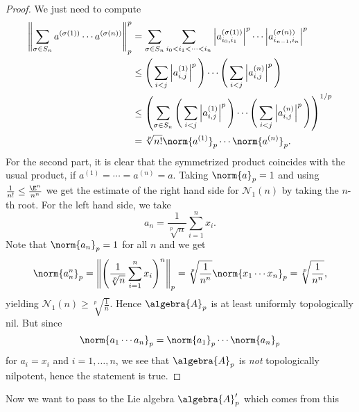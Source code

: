 \documentclass[
11pt,                          %
english                        %
]{article}
\begin{document}
\begin{proof}
	We just need to compute
	\begin{align*}
		\left\Vert
			\sum\limits_{\sigma \in S_n}
			a^{(\sigma(1))} \cdots a^{(\sigma(n))}
		\right\Vert_p^p
		&=
		\sum\limits_{\sigma \in S_n}
		\sum\limits_{i_0 < i_1 < \cdots < i_n}
		\left|
			a_{i_0, i_1}^{(\sigma(1))}
		\right|^p
			\cdots
		\left|
			a_{i_{n-1}, i_n}^{(\sigma(n))}
		\right|^p
		\\
		& \leq
		\Bigg(
			\sum\limits_{i < j}
			\left|
				a_{i,j}^{(1)}
			\right|^p
		\Bigg)
		\cdots
		\Bigg(
			\sum\limits_{i < j}
			\left|
				a_{i,j}^{(n)}
			\right|^p
		\Bigg)
		\\
		& \leq
		\left(
			\sum\limits_{\sigma \in S_n}
			\Bigg(
				\sum\limits_{i < j}
				\left|
					a_{i,j}^{(1)}
				\right|^p
			\Bigg)
			\cdots
			\Bigg(
				\sum\limits_{i < j}
				\left|
					a_{i,j}^{(n)}
				\right|^p
			\Bigg)
		\right)^{1/p}
		\\
		&=
		\sqrt[p]{n!}
		\norm{a^{(1)}}_p \cdots \norm{a^{(n)}}_p.
	\end{align*}
	For the second part, it is clear that the symmetrized product coincides with 
	the usual product, if $a^{(1)} = \cdots = a^{(n)} = a$. Taking $\norm{a}_p = 1$
	and using $\frac{1}{n!} \leq \frac{\E^n}{n^n}$ we get the estimate of the right 
	hand side for $\mathcal{N}_1(n)$ by taking the $n$-th root.
	For the left hand side, we take
	\begin{equation*}
		a_n 
		=
		\frac{1}{\sqrt[p]{n}}
		\sum\limits_{i=1}^n
		x_i.
	\end{equation*}
	Note that $\norm{a_n}_p = 1$ for all $n$ and we get
	\begin{equation*}
		\norm{a_n^n}_p
		=
		\left\Vert
			\left(
				\frac{1}{\sqrt[p]{n}}
				\sum\limits_{i=1}^n
				x_i
			\right)^n
		\right\Vert_p
		=
		\sqrt[p]{\frac{1}{n^n}}
		\norm{x_1 \cdots x_n}_p
		=
		\sqrt[p]{\frac{1}{n^n}},
	\end{equation*}
	yielding $\mathcal{N}_1(n) \geq \sqrt[p]{\frac{1}{n}}$.
	Hence $\algebra{A}_p$ is at least uniformly topologically nil. But since
	\begin{equation*}
		\norm{a_1 \cdots a_n}_p
		=
		\norm{a_1}_p \cdots \norm{a_n}_p
	\end{equation*}
	for $a_i = x_i$ and $i = 1, \ldots, n$, we see that $\algebra{A}_p$ is 
	\emph{not} topologically nilpotent, hence the statement is true.
\end{proof}
Now we want to pass to the Lie algebra $\algebra{A}'_p$ which comes from this 
\end{document}

